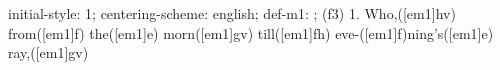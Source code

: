 initial-style: 1;
centering-scheme: english;
def-m1: \grealign;
(f3) 1. Who,([em1]hv) from([em1]f) the([em1]e) morn([em1]gv) till([em1]fh) eve-([em1]f)ning's([em1]e) ray,([em1]gv)